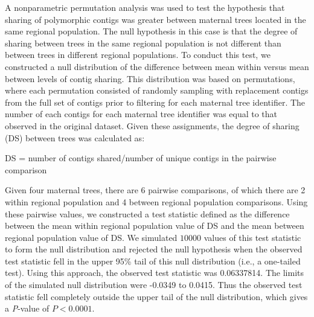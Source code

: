 \documentclass[smallextended]{svjour3}
\begin{document}
A nonparametric permutation analysis was used to test the hypothesis that sharing of polymorphic
contigs was greater between maternal trees located in the same regional population. The null hypothesis
in this case is that the degree of sharing between trees in the same regional population is not different
than between trees in different regional populations. To conduct this test, we constructed a null distribution 
of the difference between mean within versus mean between levels of contig sharing. This distribution was
based on permutations, where each permutation consisted of randomly sampling with replacement contigs from the full set
of contigs prior to filtering for each maternal tree identifier. The number of each contigs for each maternal
tree identifier was equal to that observed in the original dataset. Given these assignments, the degree of sharing (DS)
between trees was calculated as:

DS = number of contigs shared/number of unique contigs in the pairwise comparison

Given four maternal trees, there are 6 pairwise comparisons, of which there are 2 within regional population and
4 between regional population comparisons. Using these pairwise values, we constructed a test statistic defined as
the difference between the mean within regional population value of DS and the mean between regional population
value of DS. We simulated $10000$ values of this test statistic to form the null distribution and rejected
the null hypothesis when the observed test statistic fell in the upper 95\% tail of this null
distribution (i.e., a one-tailed test). Using this approach, the observed test statistic was 0.06337814. The limits of the simulated null distribution
were -0.0349 to 0.0415. Thus the observed test statistic fell completely outside the upper tail of the null distribution, which
gives a \textit{P}-value of $P < 0.0001$.
\end{document}
